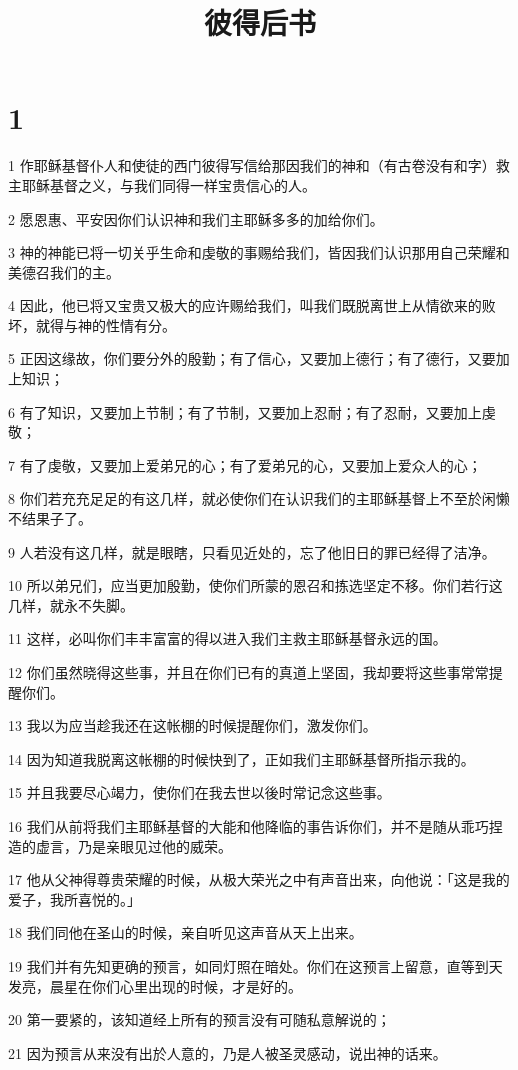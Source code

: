 

\title{彼得后书}


\chapter{1}

\par 1 作耶稣基督仆人和使徒的西门彼得写信给那因我们的神和（有古卷没有和字）救主耶稣基督之义，与我们同得一样宝贵信心的人。
\par 2 愿恩惠、平安因你们认识神和我们主耶稣多多的加给你们。
\par 3 神的神能已将一切关乎生命和虔敬的事赐给我们，皆因我们认识那用自己荣耀和美德召我们的主。
\par 4 因此，他已将又宝贵又极大的应许赐给我们，叫我们既脱离世上从情欲来的败坏，就得与神的性情有分。
\par 5 正因这缘故，你们要分外的殷勤；有了信心，又要加上德行；有了德行，又要加上知识；
\par 6 有了知识，又要加上节制；有了节制，又要加上忍耐；有了忍耐，又要加上虔敬；
\par 7 有了虔敬，又要加上爱弟兄的心；有了爱弟兄的心，又要加上爱众人的心；
\par 8 你们若充充足足的有这几样，就必使你们在认识我们的主耶稣基督上不至於闲懒不结果子了。
\par 9 人若没有这几样，就是眼瞎，只看见近处的，忘了他旧日的罪已经得了洁净。
\par 10 所以弟兄们，应当更加殷勤，使你们所蒙的恩召和拣选坚定不移。你们若行这几样，就永不失脚。
\par 11 这样，必叫你们丰丰富富的得以进入我们主救主耶稣基督永远的国。
\par 12 你们虽然晓得这些事，并且在你们已有的真道上坚固，我却要将这些事常常提醒你们。
\par 13 我以为应当趁我还在这帐棚的时候提醒你们，激发你们。
\par 14 因为知道我脱离这帐棚的时候快到了，正如我们主耶稣基督所指示我的。
\par 15 并且我要尽心竭力，使你们在我去世以後时常记念这些事。
\par 16 我们从前将我们主耶稣基督的大能和他降临的事告诉你们，并不是随从乖巧捏造的虚言，乃是亲眼见过他的威荣。
\par 17 他从父神得尊贵荣耀的时候，从极大荣光之中有声音出来，向他说：「这是我的爱子，我所喜悦的。」
\par 18 我们同他在圣山的时候，亲自听见这声音从天上出来。
\par 19 我们并有先知更确的预言，如同灯照在暗处。你们在这预言上留意，直等到天发亮，晨星在你们心里出现的时候，才是好的。
\par 20 第一要紧的，该知道经上所有的预言没有可随私意解说的；
\par 21 因为预言从来没有出於人意的，乃是人被圣灵感动，说出神的话来。

